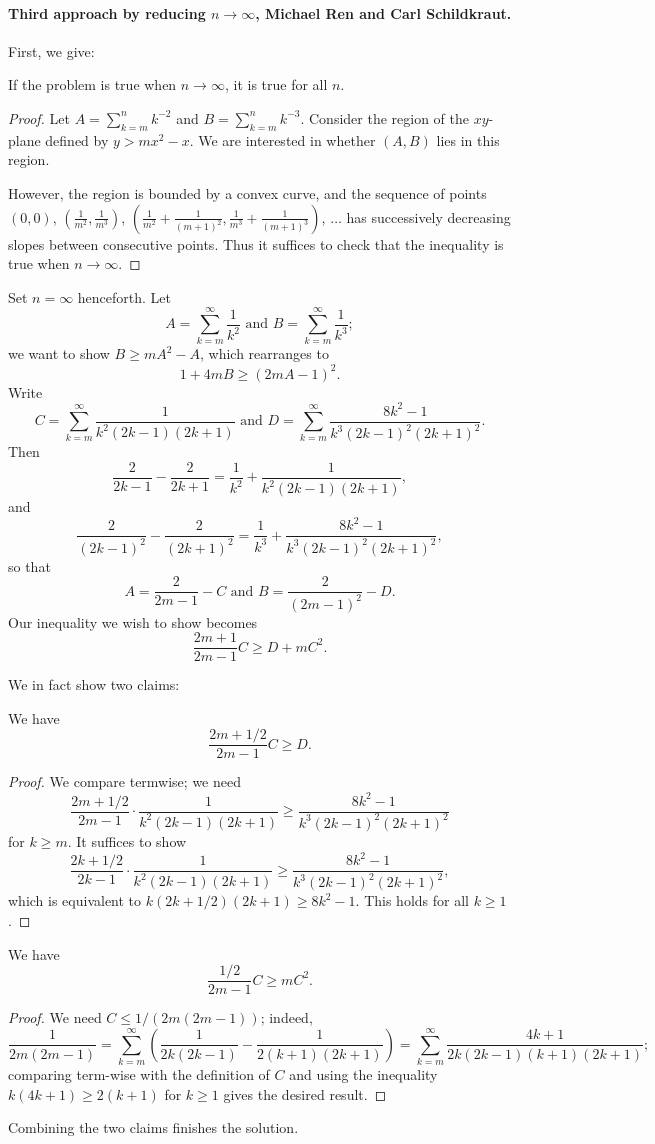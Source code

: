 \documentclass[11pt]{scrartcl}
\begin{document}
\paragraph{Third approach by reducing $n \to \infty$, Michael Ren and Carl Schildkraut.}
First, we give:
\begin{claim*}
  If the problem is true when $n \to \infty$, it is true for all $n$.
\end{claim*}
\begin{proof}
  Let $A = \sum_{k=m}^n k^{-2}$ and $B = \sum_{k=m}^n k^{-3}$.
  Consider the region of the $xy$-plane defined by $y > mx^2 - x$.
  We are interested in whether $(A,B)$ lies in this region.

  However, the region is bounded by a convex curve,
  and the sequence of points $(0,0)$,
  $\left( \frac1{m^2},\frac1{m^3} \right)$,
  $\left( \frac1{m^2}+\frac1{(m+1)^2},\frac1{m^3}+\frac1{(m+1)^3} \right)$,
  $\dots$ has successively decreasing slopes between consecutive points.
  Thus it suffices to check that the inequality is true when $n\to\infty$.
\end{proof}

Set $n=\infty$ henceforth.
Let
\[ A=\sum_{k=m}^\infty\frac1{k^2}\text{ and }B=\sum_{k=m}^\infty \frac1{k^3}; \]
we want to show $B\geq mA^2-A$, which rearranges to
\[ 1+4mB\geq (2mA-1)^2. \]
Write
\[ C=\sum_{k=m}^\infty\frac1{k^2(2k-1)(2k+1)}
  \text{ and }D=\sum_{k=m}^\infty \frac{8k^2-1}{k^3(2k-1)^2(2k+1)^2}. \]
Then
\[ \frac2{2k-1}-\frac2{2k+1}=\frac1{k^2}+\frac1{k^2(2k-1)(2k+1)}, \]
and
\[ \frac2{(2k-1)^2}-\frac2{(2k+1)^2}
  = \frac1{k^3}+\frac{8k^2-1}{k^3(2k-1)^2(2k+1)^2}, \]
so that
\[ A=\frac2{2m-1}-C \text{ and } B=\frac2{(2m-1)^2}-D. \]
Our inequality we wish to show becomes
\[ \frac{2m+1}{2m-1}C\geq D+mC^2. \]

We in fact show two claims:
\begin{claim*}
  We have \[ \frac{2m+1/2}{2m-1}C\geq D. \]
\end{claim*}
\begin{proof}
  We compare termwise; we need
  \[ \frac{2m+1/2}{2m-1}\cdot \frac1{k^2(2k-1)(2k+1)}
    \geq \frac{8k^2-1}{k^3(2k-1)^2(2k+1)^2} \]
  for $k\geq m$. It suffices to show
  \[ \frac{2k+1/2}{2k-1}\cdot \frac1{k^2(2k-1)(2k+1)}
    \geq \frac{8k^2-1}{k^3(2k-1)^2(2k+1)^2}, \]
  which is equivalent to $k(2k+1/2)(2k+1)\geq 8k^2-1$.
  This holds for all $k\geq 1$.
\end{proof}
\begin{claim*}
  We have \[ \frac{1/2}{2m-1}C\geq mC^2. \]
\end{claim*}
\begin{proof}
  We need $C\leq 1/(2m(2m-1))$; indeed,
  \[ \frac1{2m(2m-1)}
    = \sum_{k=m}^\infty\left(\frac1{2k(2k-1)} - \frac1{2(k+1)(2k+1)}\right)
    = \sum_{k=m}^\infty\frac{4k+1}{2k(2k-1)(k+1)(2k+1)}; \]
  comparing term-wise with the definition of $C$ and
  using the inequality $k(4k+1)\geq 2(k+1)$ for $k\geq 1$
  gives the desired result.
\end{proof}
Combining the two claims finishes the solution.
\end{document}
